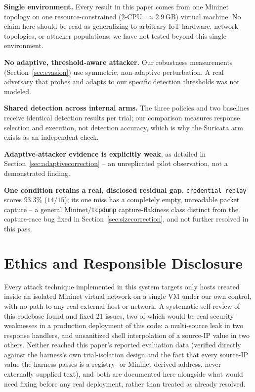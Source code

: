 \documentclass[conference]{IEEEtran}
\begin{document}
\textbf{Single environment.} Every result in this paper comes from one Mininet topology on one
resource-constrained ($2$-CPU, $\approx2.9\,$GB) virtual machine. No claim here should be read as
generalizing to arbitrary IoT hardware, network topologies, or attacker populations; we have not
tested beyond this single environment.

\textbf{No adaptive, threshold-aware attacker.} Our robustness measurements (Section~\ref{sec:evasion}) use
symmetric, non-adaptive perturbation. A real adversary that probes and adapts to our specific
detection thresholds was not modeled.

\textbf{Shared detection across internal arms.} The three policies and two baselines receive
identical detection results per trial; our comparison measures response selection and execution,
not detection accuracy, which is why the Suricata arm exists as an independent check.

\textbf{Adaptive-attacker evidence is explicitly weak}, as detailed in
Section~\ref{sec:adaptivecorrection} -- an unreplicated pilot observation, not a demonstrated finding.

\textbf{One condition retains a real, disclosed residual gap.} \texttt{credential\_replay} scores
$93.3\%$ ($14/15$); its one miss has a completely empty, unreadable packet capture -- a general
Mininet/\texttt{tcpdump} capture-flakiness class distinct from the capture-race bug fixed in
Section~\ref{sec:sizecorrection}, and not further resolved in this pass.

\section{Ethics and Responsible Disclosure}

Every attack technique implemented in this system targets only hosts created inside an isolated
Mininet virtual network on a single VM under our own control, with no path to any real external
host or network. A systematic self-review of this codebase found and fixed 21 issues, two of which
would be real security weaknesses in a production deployment of this code: a multi-source leak in
two response handlers, and unsanitized shell interpolation of a source-IP value in two others.
Neither reached this paper's reported evaluation data (verified directly against the harness's own
trial-isolation design and the fact that every source-IP value the harness passes is a registry- or
Mininet-derived address, never externally supplied text), and both are documented here alongside
what would need fixing before any real deployment, rather than treated as already resolved.
\end{document}
